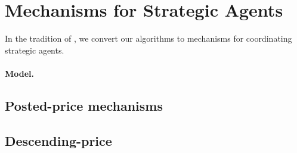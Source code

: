 \section{Mechanisms for Strategic Agents} \label{sec:mechanisms}

In the tradition of , we convert our algorithms to mechanisms for coordinating strategic agents.

\paragraph{Model.}



\subsection{Posted-price mechanisms}



\subsection{Descending-price}




